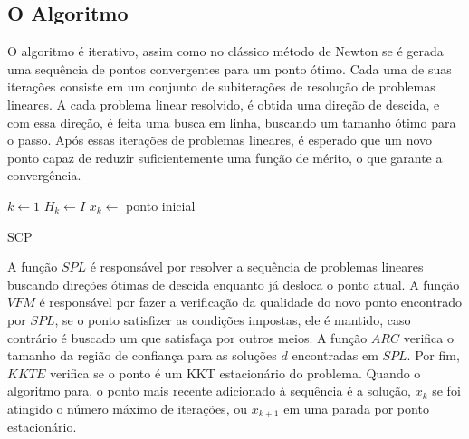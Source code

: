 \subsection{O Algoritmo}
O algoritmo é iterativo, assim como no clássico método de Newton se é gerada
uma sequência de pontos convergentes para um ponto ótimo.
Cada uma de suas iterações consiste em um conjunto de subiterações de
resolução de problemas lineares. A cada problema linear resolvido, é obtida
uma direção de descida, e com essa direção, é feita uma busca em linha,
buscando um tamanho ótimo para o passo. Após essas iterações de problemas
lineares, é esperado que um novo ponto capaz de reduzir suficientemente uma
função de mérito, o que garante a convergência.



\begin{algorithm}[H]
  \SetAlgoLined
  \( k \gets 1 \)\;
  \( H_k \gets I \)\;
  \( x_k \gets \) ponto inicial\;
  
  \caption{SCP}
\end{algorithm}
\vspace{15pt}


A função \(SPL\) é responsável por resolver a sequência de problemas lineares
buscando direções ótimas de descida enquanto já desloca o ponto atual. A função
\(VFM\) é responsável por fazer a verificação da qualidade do novo ponto encontrado
por \(SPL\), se o ponto satisfizer as condições impostas, ele é mantido, caso contrário
é buscado um que satisfaça por outros meios. A função \(ARC\) verifica o tamanho da região
de confiança para as soluções \(d\) encontradas em \(SPL\). Por fim, \(KKTE\) verifica
se o ponto é um KKT estacionário do problema. Quando o algoritmo para, o ponto
mais recente adicionado à sequência é a solução, \(x_k\) se foi atingido
o número máximo de iterações, ou \(x_{k+1}\) em uma parada por ponto
estacionário.

